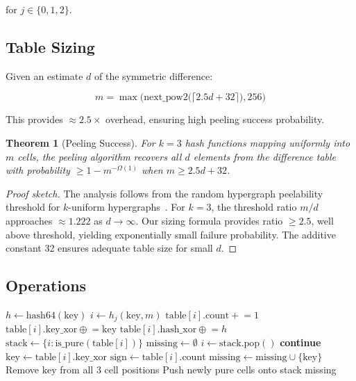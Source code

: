 \documentclass[11pt,twocolumn]{article}
\newtheorem{theorem}{Theorem}
\theoremstyle{definition}
\begin{document}
for $j \in \{0, 1, 2\}$.

\subsection{Table Sizing}

Given an estimate $d$ of the symmetric difference:

\begin{equation}
  m = \max\bigl(\text{next\_pow2}\bigl(\lceil 2.5d + 32 \rceil\bigr),
  256\bigr)
  \label{eq:sizing}
\end{equation}

This provides $\approx 2.5\times$ overhead, ensuring high peeling success
probability.

\begin{theorem}[Peeling Success]
\label{thm:peel}
For $k = 3$ hash functions mapping uniformly into $m$ cells, the peeling
algorithm recovers all $d$ elements from the difference table with
probability $\geq 1 - m^{-\Omega(1)}$ when $m \geq 2.5d + 32$.
\end{theorem}

\begin{proof}[Proof sketch]
The analysis follows from the random hypergraph peelability threshold for
$k$-uniform hypergraphs~\cite{iblt}. For $k = 3$, the threshold ratio
$m/d$ approaches $\approx 1.222$ as $d \to \infty$. Our sizing formula
provides ratio $\geq 2.5$, well above threshold, yielding exponentially
small failure probability. The additive constant 32 ensures adequate
table size for small $d$.
\end{proof}

\subsection{Operations}

\begin{algorithm}[t]
\caption{ICT Insert and Peel}
\label{alg:ict}
\begin{algorithmic}[1]
  \State $h \gets \text{hash64}(\text{key})$
    \State $i \gets h_j(\text{key}, m)$
    \State $\text{table}[i].\text{count} \mathrel{+}= 1$
    \State $\text{table}[i].\text{key\_xor} \mathrel{\oplus}= \text{key}$
    \State $\text{table}[i].\text{hash\_xor} \mathrel{\oplus}= h$
  \EndFor
\EndProcedure
\Statex
{}
  \State $\text{stack} \gets \{i : \text{is\_pure}(\text{table}[i])\}$
  \State $\text{missing} \gets \emptyset$
    \State $i \gets \text{stack.pop}()$
     \textbf{continue} \EndIf
    \State $\text{key} \gets \text{table}[i].\text{key\_xor}$
    \State $\text{sign} \gets \text{table}[i].\text{count}$
     $\text{missing} \gets \text{missing}
      \cup \{\text{key}\}$ \EndIf
    \State Remove $\text{key}$ from all 3 cell positions
    \State Push newly pure cells onto stack
  \EndWhile
  \State \Return missing
\EndProcedure
\end{algorithmic}
\end{algorithm}
\end{document}
